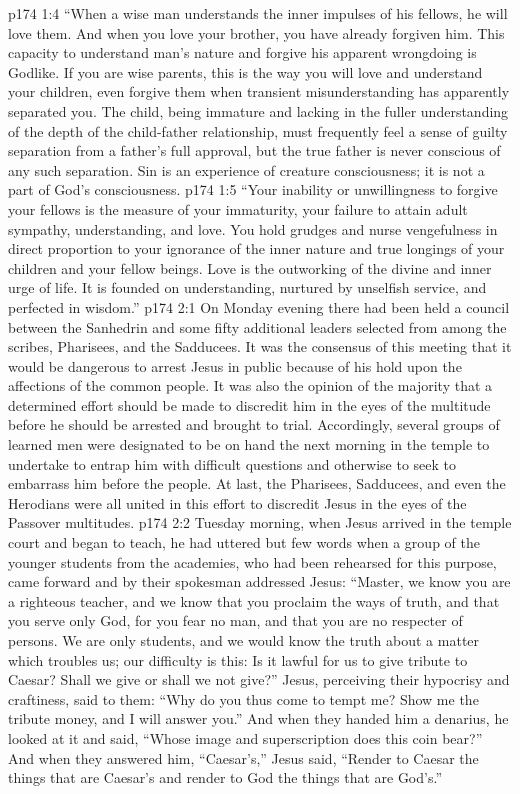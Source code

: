 \vs p174 1:4 \textcolor{ubdarkred}{“When a wise man understands the inner impulses of his fellows, he will love them. And when you love your brother, you have already forgiven him. This capacity to understand man’s nature and forgive his apparent wrongdoing is Godlike. If you are wise parents, this is the way you will love and understand your children, even forgive them when transient misunderstanding has apparently separated you. The child, being immature and lacking in the fuller understanding of the depth of the child\hyp{}father relationship, must frequently feel a sense of guilty separation from a father’s full approval, but the true father is never conscious of any such separation. Sin is an experience of creature consciousness; it is not a part of God’s consciousness.}\plusone
\vs p174 1:5 \textcolor{ubdarkred}{“Your inability or unwillingness to forgive your fellows is the measure of your immaturity, your failure to attain adult sympathy, understanding, and love. You hold grudges and nurse vengefulness in direct proportion to your ignorance of the inner nature and true longings of your children and your fellow beings. Love is the outworking of the divine and inner urge of life. It is founded on understanding, nurtured by unselfish service, and perfected in wisdom.”}
\vs p174 2:1 On Monday evening there had been held a council between the Sanhedrin and some fifty additional leaders selected from among the scribes, Pharisees, and the Sadducees. It was the consensus of this meeting that it would be dangerous to arrest Jesus in public because of his hold upon the affections of the common people. It was also the opinion of the majority that a determined effort should be made to discredit him in the eyes of the multitude before he should be arrested and brought to trial. Accordingly, several groups of learned men were designated to be on hand the next morning in the temple to undertake to entrap him with difficult questions and otherwise to seek to embarrass him before the people. At last, the Pharisees, Sadducees, and even the Herodians were all united in this effort to discredit Jesus in the eyes of the Passover multitudes.
\vs p174 2:2 Tuesday morning, when Jesus arrived in the temple court and began to teach, he had uttered but few words when a group of the younger students from the academies, who had been rehearsed for this purpose, came forward and by their spokesman addressed Jesus: “Master, we know you are a righteous teacher, and we know that you proclaim the ways of truth, and that you serve only God, for you fear no man, and that you are no respecter of persons. We are only students, and we would know the truth about a matter which troubles us; our difficulty is this: Is it lawful for us to give tribute to Caesar? Shall we give or shall we not give?” Jesus, perceiving their hypocrisy and craftiness, said to them: \textcolor{ubdarkred}{“Why do you thus come to tempt me? Show me the tribute money, and I will answer you.”} And when they handed him a denarius, he looked at it and said, \textcolor{ubdarkred}{“Whose image and superscription does this coin bear?”} And when they answered him, “Caesar’s,” Jesus said, \textcolor{ubdarkred}{“Render to Caesar the things that are Caesar’s and render to God the things that are God’s.”}
